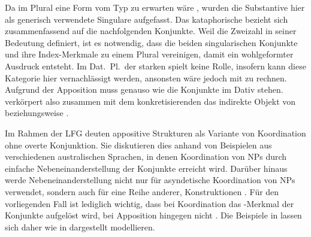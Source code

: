 Da im Plural eine Form vom Typ   zu erwarten wäre
\autocite[125]{ksw2}, wurden die Substantive hier als generisch verwendete
Singulare aufgefasst. Das kataphorische
  bezieht sich zusammenfassend auf die nachfolgenden
Konjunkte. Weil  die Zweizahl in seiner Bedeutung definiert, ist es
notwendig, dass die beiden singularischen Konjunkte   und
  ihre Index-Merkmale zu einem Plural vereinigen, damit
ein wohlgeformter Ausdruck entsteht. Im Dat.~Pl.\ der starken
 spielt  keine Rolle, insofern kann diese
Kategorie hier vernachlässigt werden, ansonsten wäre jedoch mit
 zu rechnen. Aufgrund der Apposition muss
 genauso wie die Konjunkte im Dativ stehen.  verkörpert
also zusammen mit dem konkretisierenden   das indirekte Objekt von   beziehungsweise
 .

Im Rahmen der LFG deuten
\citet{sadlernordlinger2006} appositive Strukturen als Variante
von Koordination ohne overte Konjunktion. Sie diskutieren dies anhand von
Beispielen aus verschiedenen australischen Sprachen, in denen Koordination von
NPs durch einfache Nebeneinanderstellung der Konjunkte erreicht wird. Darüber
hinaus werde Nebeneinanderstellung nicht nur für asyndetische Koordination von
NPs verwendet, sondern auch für eine Reihe anderer, 
Konstruktionen \autocite[440--441]{sadlernordlinger2006}. Für
den vorliegenden Fall ist lediglich wichtig, dass bei Koordination das
-Merkmal der Konjunkte aufgelöst wird, bei Apposition hingegen nicht
\autocite[444]{sadlernordlinger2006}. Die Beispiele in
 lassen sich daher wie in
 dargestellt modellieren.

